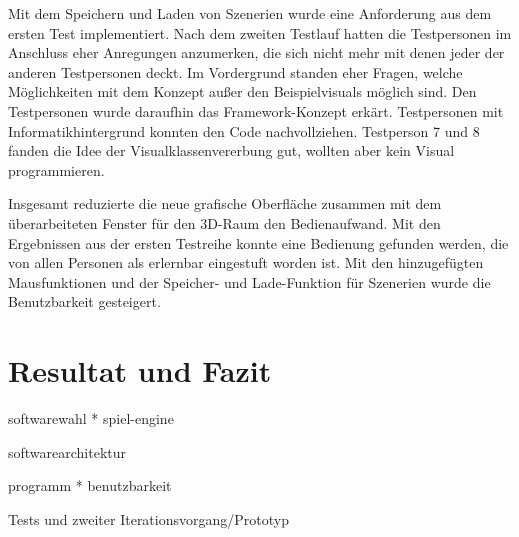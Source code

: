 Mit dem Speichern und Laden von Szenerien wurde eine Anforderung aus dem ersten Test implementiert. Nach dem zweiten Testlauf hatten die Testpersonen
im Anschluss eher Anregungen anzumerken, die sich nicht mehr mit denen jeder der anderen Testpersonen deckt. Im Vordergrund standen eher Fragen,
welche M\"oglichkeiten mit dem Konzept au\ss{}er den Beispielvisuals m\"oglich sind. Den Testpersonen wurde daraufhin das Framework-Konzept erk\"art.
Testpersonen mit Informatikhintergrund konnten den Code nachvollziehen. Testperson 7 und 8 fanden die Idee der Visualklassenvererbung gut, wollten aber
kein Visual programmieren.

Insgesamt reduzierte die neue grafische Oberfl\"ache zusammen mit dem \"uberarbeiteten Fenster f\"ur den 3D-Raum den Bedienaufwand. Mit den Ergebnissen aus
der ersten Testreihe konnte eine Bedienung gefunden werden, die von allen Personen als erlernbar eingestuft worden ist.
Mit den hinzugef\"ugten Mausfunktionen und der Speicher- und Lade-Funktion f\"ur Szenerien wurde die Benutzbarkeit gesteigert.

\section{Resultat und Fazit}

softwarewahl
    * spiel-engine

softwarearchitektur

programm
    * benutzbarkeit

Tests und zweiter Iterationsvorgang/Prototyp


